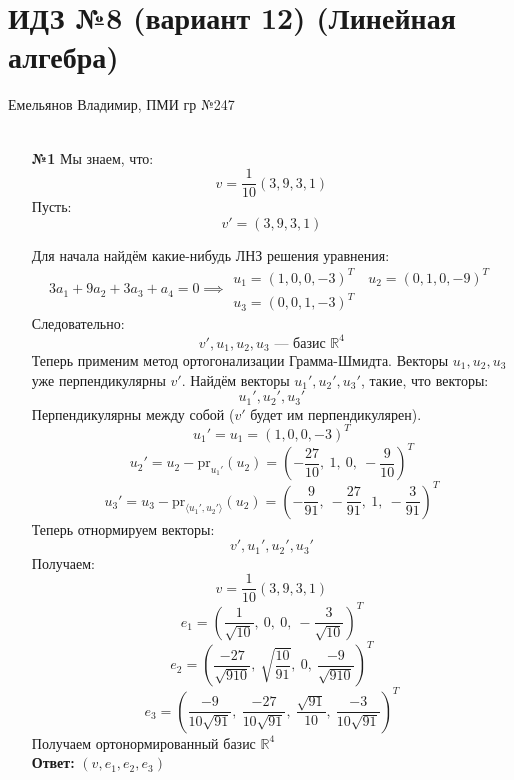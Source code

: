 \documentclass[a4paper]{article}
\renewcommand{\f}[2]{\frac{#1}{#2}}
\newcommand{\RR}{\mathbb{R}}
\begin{document}
\section*{ИДЗ №8 (вариант 12) (Линейная алгебра)}
 {\large Емельянов Владимир, ПМИ гр №247}\\\\
\begin{enumerate}
    \item[\textbf{№1}]Мы знаем, что:
    $$v = \f{1}{10}(3, 9, 3, 1)$$
    Пусть:
    $$v' = (3, 9, 3, 1)$$
    
    Для начала найдём какие-нибудь ЛНЗ решения уравнения:
    $$3a_1 + 9a_2 + 3a_3 + a_4 = 0 \implies \begin{aligned}
        u_1 = (1, 0, 0, -3)^T \quad u_2 = (0, 1, 0, -9)^T\\
        u_3 = (0, 0, 1, -3)^T
    \end{aligned}$$
    Следовательно:
    $$v', u_1, u_2, u_3 \text{ --- базис $\RR^4$}$$
    Теперь применим метод ортогонализации Грамма-Шмидта. 
    Векторы $u_1, u_2, u_3$ уже перпендикулярны $v'$. Найдём векторы $u_1', u_2', u_3'$, такие, что векторы:
    $$u_1', u_2', u_3'$$
    Перпендикулярны между собой ($v'$ будет им перпендикулярен).
    $$u_1' = u_1 = (1, 0, 0, -3)^T$$
    $$u_2' = u_2 - \text{pr}_{u_1'}(u_2) = \left(-\frac{27}{10},\ 1,\ 0,\ -\frac{9}{10}\right)^T$$
    $$u_3' = u_3 - \text{pr}_{\langle u_1', u_2' \rangle}(u_2) =  \left( -\frac{9}{91},\ -\frac{27}{91},\ 1,\ -\frac{3}{91} \right)^T$$
    Теперь отнормируем векторы:
    $$v', u_1', u_2', u_3'$$
    Получаем:
    $$v = \f{1}{10}(3, 9, 3, 1)$$
    $$e_1 = \left( \frac{1}{\sqrt{10}},\ 0,\ 0,\ -\frac{3}{\sqrt{10}} \right)^T$$
    $$e_2 =  \left( \frac{-27}{\sqrt{910}},\ \sqrt{\frac{10}{91}},\ 0,\ \frac{-9}{\sqrt{910}} \right)^T$$
    $$e_3 = \left( \frac{-9}{10\sqrt{91}},\ \frac{-27}{10\sqrt{91}},\ \frac{\sqrt{91}}{10},\ \frac{-3}{10\sqrt{91}} \right)^T$$
    Получаем ортонормированный базис $\RR^4$\\
    \textbf{Ответ: } $(v, e_1, e_2, e_3)$\\



\end{enumerate}
\end{document}
